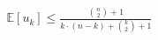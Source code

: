 \documentclass[preview]{standalone}
\begin{document}
\begin{align*}
\mathbb{E}[u_k] \leq \frac{\binom{n}{2} + 1}{k \cdot (n-k)+\binom{k}{2}+1}
\end{align*}
\end{document}
